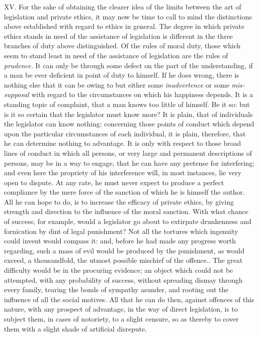 \documentclass[12pt]{report}
\begin{document}
XV. For the sake of obtaining the clearer idea of the limits between the
art of legislation and private ethics, it may now be time to call to
mind the distinctions above established with regard to ethics in
general. The degree in which private ethics stands in need of the
assistance of legislation is different in the three branches of duty
above distinguished. Of the rules of moral duty, those which seem to
stand least in need of the assistance of legislation are the rules of
\emph{prudence.} It can only be through some defect on the part of the
understanding, if a man be ever deficient in point of duty to himself.
If he does wrong, there is nothing else that it can be owing to but
either some \emph{inadvertence} or some \emph{mis-supposal} with regard
to the circumstances on which his happiness depends. It is a standing
topic of complaint, that a man knows too little of himself. Be it so:
but is it so certain that the legislator must know more? It is plain,
that of individuals the legislator can know nothing: concerning those
points of conduct which depend upon the particular circumstances of each
individual, it is plain, therefore, that he can determine nothing to
advantage. It is only with respect to those broad lines of conduct in
which all persons, or very large and permanent descriptions of persons,
may be in a way to engage, that he can have any pretense for
interfering; and even here the propriety of his interference will, in
most instances, lie very open to dispute. At any rate, he must never
expect to produce a perfect compliance by the mere force of the sanction
of which he is himself the author. All he can hope to do, is to increase
the efficacy of private ethics, by giving strength and direction to the
influence of the moral sanction. With what chance of success, for
example, would a legislator go about to extirpate drunkenness and
fornication by dint of legal punishment? Not all the tortures which
ingenuity could invent would compass it: and, before he had made any
progress worth regarding, such a mass of evil would be produced by the
punishment, as would exceed, a thousandfold, the utmost possible
mischief of the offence.. The great difficulty would be in the procuring
evidence; an object which could not be attempted, with any probability
of success, without spreading dismay through every family, tearing the
bonds of sympathy asunder, and rooting out the influence of all the
social motives. All that he can do then, against offences of this
nature, with any prospect of advantage, in the way of direct
legislation, is to subject them, in cases of notoriety, to a slight
censure, so as thereby to cover them with a slight shade of artificial
disrepute.
\end{document}
